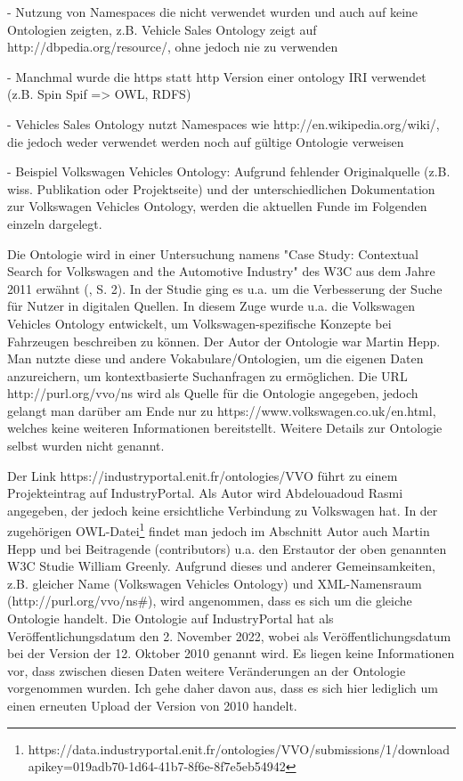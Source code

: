 \documentclass{article}
\begin{document}
- Nutzung von Namespaces die nicht verwendet wurden und auch auf keine Ontologien zeigten, z.B. Vehicle Sales Ontology zeigt auf http://dbpedia.org/resource/, ohne jedoch nie zu verwenden

- Manchmal wurde die https statt http Version einer ontology IRI verwendet (z.B. Spin Spif => OWL, RDFS)

- Vehicles Sales Ontology nutzt Namespaces wie http://en.wikipedia.org/wiki/, die jedoch weder verwendet werden noch auf gültige Ontologie verweisen

%

  - Beispiel Volkswagen Vehicles Ontology: Aufgrund fehlender Originalquelle (z.B. wiss. Publikation oder Projektseite) und der unterschiedlichen Dokumentation zur Volkswagen Vehicles Ontology, werden die aktuellen Funde im Folgenden einzeln dargelegt.

Die Ontologie wird in einer Untersuchung namens "Case Study: Contextual Search for Volkswagen and the Automotive Industry" des W3C aus dem Jahre 2011 erwähnt (\cite{greenly2011case}, S. 2).
In der Studie ging es u.a. um die Verbesserung der Suche für Nutzer in digitalen Quellen.
In diesem Zuge wurde u.a. die Volkswagen Vehicles Ontology entwickelt, um Volkswagen-spezifische Konzepte bei Fahrzeugen beschreiben zu können.
Der Autor der Ontologie war Martin Hepp.
Man nutzte diese und andere Vokabulare/Ontologien, um die eigenen Daten anzureichern, um kontextbasierte Suchanfragen zu ermöglichen.
Die URL http://purl.org/vvo/ns wird als Quelle für die Ontologie angegeben, jedoch gelangt man darüber am Ende nur zu https://www.volkswagen.co.uk/en.html, welches keine weiteren Informationen bereitstellt.
Weitere Details zur Ontologie selbst wurden nicht genannt.

Der Link https://industryportal.enit.fr/ontologies/VVO führt zu einem Projekteintrag auf IndustryPortal.
Als Autor wird Abdelouadoud Rasmi angegeben, der jedoch keine ersichtliche Verbindung zu Volkswagen hat.
In der zugehörigen OWL-Datei\footnote{https://data.industryportal.enit.fr/ontologies/VVO/submissions/1/downloadapikey=019adb70-1d64-41b7-8f6e-8f7e5eb54942} findet man jedoch im Abschnitt Autor auch Martin Hepp und bei Beitragende (contributors) u.a. den Erstautor der oben genannten W3C Studie William Greenly.
Aufgrund dieses und anderer Gemeinsamkeiten, z.B. gleicher Name (Volkswagen Vehicles Ontology) und XML-Namensraum (http://purl.org/vvo/ns\#), wird angenommen, dass es sich um die gleiche Ontologie handelt. Die Ontologie auf IndustryPortal hat als Veröffentlichungsdatum den 2. November 2022, wobei als Veröffentlichungsdatum bei der Version der 12. Oktober 2010 genannt wird.
Es liegen keine Informationen vor, dass zwischen diesen Daten weitere Veränderungen an der Ontologie vorgenommen wurden.
Ich gehe daher davon aus, dass es sich hier lediglich um einen erneuten Upload der Version von 2010 handelt.
\end{document}
